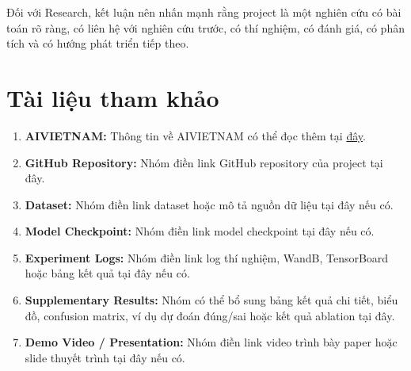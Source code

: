 \documentclass[12pt]{ai_conquer2026}
\begin{document}
Đối với Research, kết luận nên nhấn mạnh rằng project là một nghiên cứu có bài toán rõ ràng, có liên hệ với nghiên cứu trước, có thí nghiệm, có đánh giá, có phân tích và có hướng phát triển tiếp theo.

\newpage
\section{Tài liệu tham khảo}
\label{section:references}
\nocite{*}
\vspace{-3.2em}
\printbibliography

\newpage
\begin{appendices}
\begin{enumerate}
\item \textbf{AIVIETNAM:} Thông tin về AIVIETNAM có thể đọc thêm tại \href{https://aivietnam.edu.vn/}{đây}.
\item \textbf{GitHub Repository:} Nhóm điền link GitHub repository của project tại đây.
\item \textbf{Dataset:} Nhóm điền link dataset hoặc mô tả nguồn dữ liệu tại đây nếu có.
\item \textbf{Model Checkpoint:} Nhóm điền link model checkpoint tại đây nếu có.
\item \textbf{Experiment Logs:} Nhóm điền link log thí nghiệm, WandB, TensorBoard hoặc bảng kết quả tại đây nếu có.
\item \textbf{Supplementary Results:} Nhóm có thể bổ sung bảng kết quả chi tiết, biểu đồ, confusion matrix, ví dụ dự đoán đúng/sai hoặc kết quả ablation tại đây.
\item \textbf{Demo Video / Presentation:} Nhóm điền link video trình bày paper hoặc slide thuyết trình tại đây nếu có.
\end{enumerate}
\end{appendices}
\end{document}
